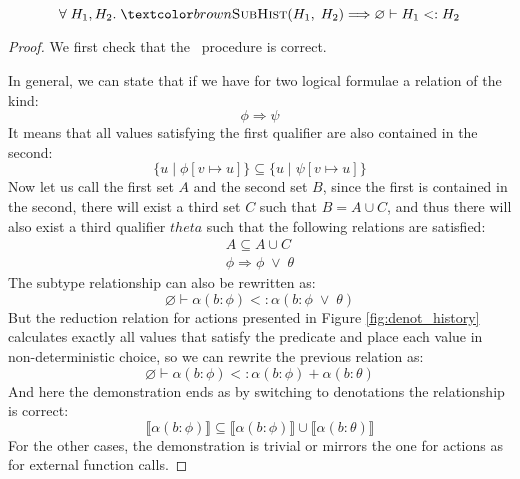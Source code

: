 \begin{theorem}
    \begin{equation*}
        \forall \;H_1, H_2. \;\subhist(H_1, \;H_2) \Longrightarrow \varnothing \vdash H_1 <: H_2
    \end{equation*}
\end{theorem}

\begin{proof}
    We first check that the \subconc\ procedure is correct.

    In general, we can state that if we have for two logical formulae a relation of the kind:
    \begin{equation}
        \phi \Longrightarrow \psi
    \end{equation}
    It means that all values satisfying the first qualifier are also contained in the second:
    \begin{equation}
        \{u \;|\; \phi[v \mapsto u]\} \subseteq \{u \;|\; \psi[v \mapsto u]\}
    \end{equation}
    Now let us call the first set $A$ and the second set $B$, since the first is contained in the second, there will exist a third set $C$ such that $B = A \cup C$, and thus there will also exist a third qualifier $theta$ such that the following relations are satisfied:
    \begin{equation}
        \begin{gathered}
            A \subseteq A \cup C \\
            \phi \Longrightarrow \phi \;\lor\; \theta
        \end{gathered}
    \end{equation}
    The subtype relationship can also be rewritten as:
    \begin{equation}
        \varnothing \vdash \alpha(b{:}\phi) <: \alpha(b{:}\phi \;\lor\; \theta)
    \end{equation}
    But the reduction relation for actions presented in Figure \ref{fig:denot_history} calculates exactly all values that satisfy the predicate and place each value in non-deterministic choice, so we can rewrite the previous relation as:
    \begin{equation}
        \varnothing \vdash \alpha(b{:}\phi) <: \alpha(b{:}\phi) + \alpha(b{:}\theta)
    \end{equation}
    And here the demonstration ends as by switching to denotations the relationship is correct:
    \begin{equation}
        \llbracket \alpha(b{:}\phi) \rrbracket \subseteq \llbracket \alpha(b{:}\phi) \rrbracket \cup \llbracket \alpha(b{:}\theta) \rrbracket
    \end{equation}
    For the other cases, the demonstration is trivial or mirrors the one for actions as for external function calls.


\end{proof}
